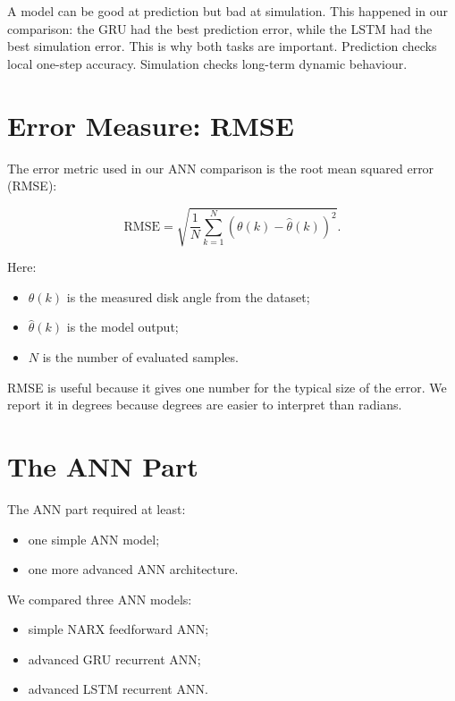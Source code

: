 \documentclass[11pt,a4paper]{article}
\begin{document}
A model can be good at prediction but bad at simulation.
This happened in our comparison: the GRU had the best prediction error, while the LSTM had the best simulation error.
This is why both tasks are important.
Prediction checks local one-step accuracy.
Simulation checks long-term dynamic behaviour.

\section{Error Measure: RMSE}

The error metric used in our ANN comparison is the root mean squared error (RMSE):

\begin{equation}
\mathrm{RMSE} =
\sqrt{\frac{1}{N}\sum_{k=1}^{N}\left(\theta(k)-\hat{\theta}(k)\right)^2}.
\end{equation}

Here:

\begin{itemize}
    \item $\theta(k)$ is the measured disk angle from the dataset;
    \item $\hat{\theta}(k)$ is the model output;
    \item $N$ is the number of evaluated samples.
\end{itemize}

RMSE is useful because it gives one number for the typical size of the error.
We report it in degrees because degrees are easier to interpret than radians.

\section{The ANN Part}

The ANN part required at least:

\begin{itemize}
    \item one simple ANN model;
    \item one more advanced ANN architecture.
\end{itemize}

We compared three ANN models:

\begin{itemize}
    \item simple NARX feedforward ANN;
    \item advanced GRU recurrent ANN;
    \item advanced LSTM recurrent ANN.
\end{itemize}
\end{document}
